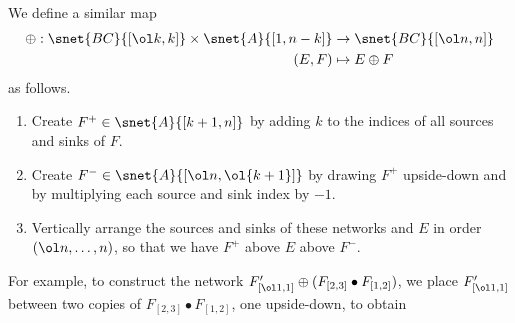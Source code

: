 We define a similar map
\begin{equation}\label{eq:oplusnet}
  \begin{aligned}
    \oplus: \snet{BC}{[\ol k,k]} \times \snet{A}{[1,n-k]} &\rightarrow \snet{BC}{[\ol n,n]}\\
      (E,F) &\mapsto E \oplus F
  \end{aligned}
\end{equation}
as follows.
\begin{enumerate}
\item Create $F^+ \in \snet{A}{[k+1,n]}$ by adding $k$ to the
  indices of all sources and sinks of $F$.
\item Create $F^- \in \snet{A}{[\ol n, \ol{k+1}]}$ by drawing $F^+$ upside-down
  and by multiplying each source and sink index by $-1$.
\item Vertically arrange the sources and sinks of these networks and $E$
  in order $(\ol n, \dotsc, n)$, so that we have $F^+$ above $E$ above $F^-$.
\end{enumerate}
For example, to construct
the network $F'_{[\ol1,1]} \oplus ( F_{[2,3]} \bullet F_{[1,2]} )$,
we place $F'_{[\ol1,1]}$ between
two copies of $F_{[2,3]} \bullet F_{[1,2]}$,
one upside-down,
to obtain
